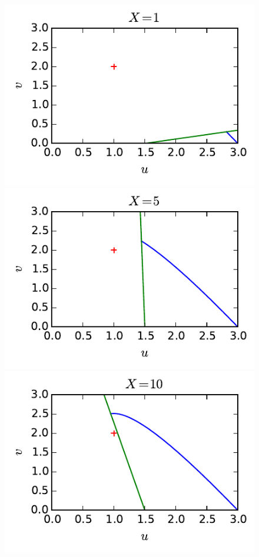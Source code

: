 	\begin{figure}[h!]
		\begin{minipage}[b]{0.40\linewidth}
			\centering \includegraphics{graphe/milne_X1.pdf}
		\end{minipage}\hfill
		\begin{minipage}[b]{0.48\linewidth}
			\centering \includegraphics{graphe/milne_X5.pdf}
		\end{minipage}
		\begin{minipage}[b]{0.40\linewidth}
			\centering \includegraphics{graphe/milne_X10.pdf}

\end{minipage}
\end{figure}
